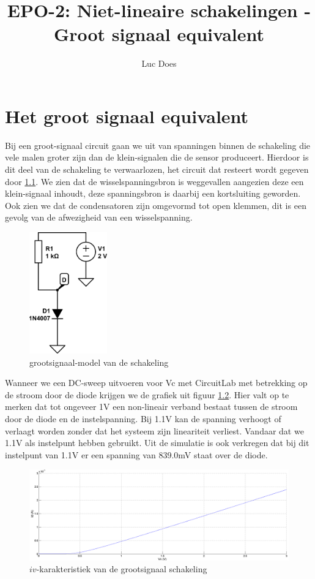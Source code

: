 \documentclass{report}
\title{EPO-2: Niet-lineaire schakelingen - Groot signaal equivalent}
\author{Luc Does}
\begin{document}
\chapter{Het groot signaal equivalent}
\label{ch:Groot signaal equivalent}

Bij een groot-signaal circuit gaan we uit van spanningen binnen de schakeling die vele malen groter zijn dan de klein-signalen die de sensor produceert. Hierdoor is dit deel van de schakeling te verwaarlozen, het circuit dat resteert wordt gegeven door \ref{fig:groot}.
We zien dat de wisselspanningsbron is weggevallen aangezien deze een klein-signaal inhoudt, deze spanningsbron is daarbij een kortsluiting geworden. Ook zien we dat de condensatoren zijn omgevormd tot open klemmen, dit is een gevolg van de afwezigheid van een wisselspanning.
\begin{figure}[H]
	\centering
	\includegraphics[width=0.3\textwidth]{grootsignaalmodel.png}
	\caption{grootsignaal-model van de schakeling}
	\label{fig:groot}
\end{figure}

\noindent Wanneer we een DC-sweep uitvoeren voor Vc met CircuitLab met betrekking op de stroom door de diode krijgen we de grafiek uit figuur \ref{fig:iv-groot}. Hier valt op te merken dat tot ongeveer 1V een non-lineair verband bestaat tussen de stroom door de diode en de instelspanning. Bij 1.1V kan de spanning verhoogt of verlaagt worden zonder dat het systeem zijn lineariteit verliest. Vandaar dat we 1.1V als instelpunt hebben gebruikt. Uit de simulatie is ook verkregen dat bij dit instelpunt van 1.1V er een spanning van 839.0mV staat over de diode.

\begin{figure}[H]
	\centering
	\includegraphics[width=1.1\textwidth]{iv-groot.png}
	\caption{$iv$-karakteristiek van de grootsignaal schakeling}
	\label{fig:iv-groot}
\end{figure}
\end{document}
